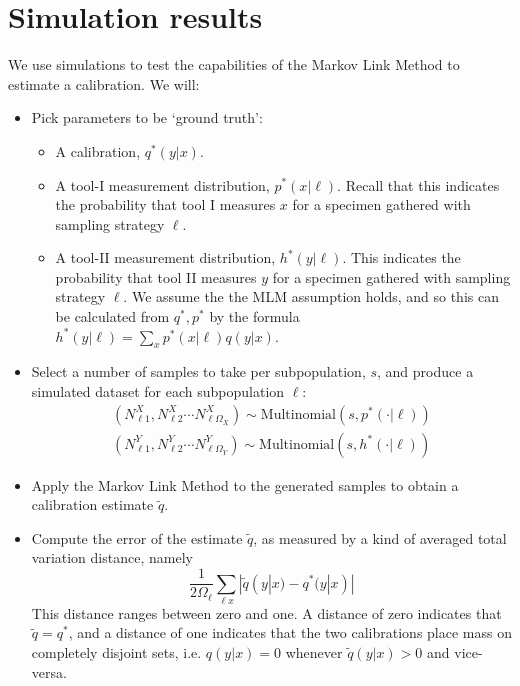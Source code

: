 \section{Simulation results}

\label{sec:simulations}

We use simulations to test the capabilities of the Markov Link Method to estimate a calibration.  We will:

\begin{itemize}
    \item Pick parameters to be `ground truth': 
    \begin{itemize}
        \item A calibration, $q^*(y|x)$.  
        \item A tool-I measurement distribution, $p^*(x|\ell)$.  Recall that this indicates the probability that tool I measures $x$ for a specimen gathered with sampling strategy $\ell$. 
        \item A tool-II measurement distribution, $h^*(y|\ell)$.   This indicates the probability that tool II measures $y$ for a specimen gathered with sampling strategy $\ell$.  We assume the the MLM assumption holds, and so this can be calculated from $q^*,p^*$ by the formula $h^*(y|\ell)=\sum_x p^*(x|\ell)q(y|x)$.  
    \end{itemize}
    \item Select a number of samples to take per subpopulation, $s$, and produce a simulated dataset for each subpopulation $\ell$:
    \begin{align*}
    (N^X_{\ell 1},N^X_{\ell 2}\cdots N^X_{\ell \Omega_X}) \sim \mathrm{Multinomial}(s,p^*(\cdot | \ell))\\
    (N^Y_{\ell 1},N^Y_{\ell 2}\cdots N^Y_{\ell \Omega_Y}) \sim \mathrm{Multinomial}(s,h^*(\cdot | \ell))
    \end{align*}
    \item Apply the Markov Link Method to the generated samples to obtain a calibration estimate $\tilde q$.
    \item Compute the error of the estimate $\tilde q$, as measured by a kind of averaged total variation distance, namely
    \[
    \frac{1}{2\Omega_{\ell}} \sum_{\ell x} |\tilde q(y|x) - q^*(y|x)|
    \]
    This distance ranges between zero and one.  A distance of zero indicates that $\tilde q=q^*$, and a distance of one indicates that the two calibrations place mass on completely disjoint sets, i.e. $q(y|x)=0$ whenever $\tilde q(y|x)>0$ and vice-versa.     
\end{itemize}

